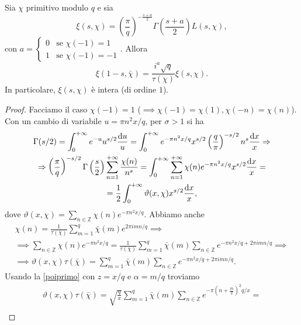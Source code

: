 \begin{prop}
  Sia $\chi$ primitivo modulo $q$ e sia
  $$\xi(s,\chi)=\left(\frac{\pi}{q}\right)^{-\frac{s+a}{2}}\Gamma\left(\frac{s+a}{2}\right)L(s,\chi),$$
  con $a=\begin{cases}
    0 &\mbox{se }\chi(-1)=1 \\
    1 &\mbox{se }\chi(-1)=-1
\end{cases}.$ Allora
\begin{equation} \label{funelle}
  \xi(1-s,\bar{\chi})=\frac{i^a\sqrt{q}}{\tau(\chi)}\xi(s,\chi).
\end{equation}
In particolare, $\xi(s,\chi)$ è intera (di ordine $1$).
\end{prop}

\begin{proof}
  Facciamo il caso $\chi(-1)=1$ ($\implies \chi(-1)=\chi(1), \chi(-n)=\chi(n)$). Con un cambio di variabile $u=\pi n^2x/q$, per $\sigma>1$ si ha
  \begin{gather*}
    \Gamma(s/2)=\int_0^{+\infty} e^{-u}u^{s/2}\frac{\mathop{}\!\mathrm{d} u}{u}=\int_0^{+\infty} e^{-\pi n^2x/q}x^{s/2}\left(\frac{q}{\pi}\right)^{-s/2}n^s\frac{\mathop{}\!\mathrm{d} x}{x} \Rightarrow \\
    \Rightarrow \left(\frac{\pi}{q}\right)^{-s/2}\Gamma\left(\frac{s}{2}\right)\sum_{n=1}^{+\infty}\frac{\chi(n)}{n^s}=\int_0^{+\infty} \sum_{n=1}^{+\infty} \chi(n)e^{-\pi n^2x/q}x^{s/2}\frac{\mathop{}\!\mathrm{d} x}{x}= \\
    =\frac{1}{2}\int_0^{+\infty} \vartheta(x,\chi)x^{s/2}\frac{\mathop{}\!\mathrm{d} x}{x},
  \end{gather*}
  dove $\displaystyle \vartheta(x,\chi)=\sum_{n \in \mathbb{Z}} \chi(n)e^{-\pi n^2x/q}$. Abbiamo anche
  \begin{gather*}
    \chi(n)=\frac{1}{\tau(\bar{\chi})}\sum_{m=1}^q \bar{\chi}(m)e^{2\pi imn/q} \implies \\
    \implies \sum_{n \in \mathbb{Z}} \chi(n)e^{-\pi n^2 x/q}=\frac{1}{\tau(\bar{\chi})} \sum_{m=1}^q \bar{\chi}(m) \sum_{n \in \mathbb{Z}} e^{-\pi n^2x/q+2\pi imn/q} \implies \\
    \implies \vartheta(x,\chi)\tau(\bar{\chi})=\sum_{m=1}^q \bar{\chi}(m) \sum_{n \in \mathbb{Z}} e^{-\pi n^2x/q+2\pi imn/q}.
  \end{gather*}
  Usando la \eqref{poiprimo} con $z=x/q$ e $\alpha=m/q$ troviamo
  \begin{gather*}
    \vartheta(x,\chi)\tau(\bar{\chi})=\sqrt{\frac{q}{x}}\sum_{m=1}^q \bar{\chi}(m) \sum_{n \in \mathbb{Z}} e^{-\pi\left(n+\frac{m}{q}\right)^2q/x}= \\

\end{gather*}
\end{proof}
